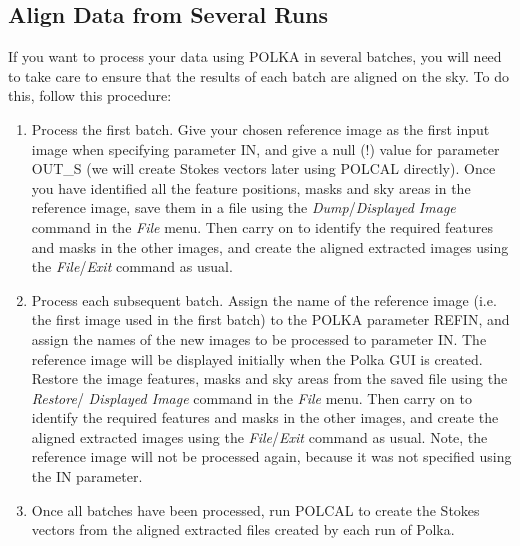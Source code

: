 \documentclass[11pt]{article}
\newcommand{\htmlref}[2]{#1}
\newcommand{\xlabel}[1]{}
\newcommand{\mylabel}[1] {\xlabel{#1}\label{#1}}
\begin{document}
\subsection {\mylabel{POLKA_MULTI_RUN}Align Data from Several Runs}
If you want to process your data using POLKA in several batches, you will
need to take care to ensure that the results of each batch are aligned on
the sky. To do this, follow this procedure:

\begin{enumerate}

\item Process the first batch. Give your chosen reference image as the
first input image when specifying parameter IN, and give a null (!) value
for parameter OUT\_S (we will create Stokes vectors later using POLCAL
directly). Once you have identified all the feature positions, masks and
sky areas in the reference image, save them in a file using the
\htmlref{\emph{Dump}} {POLKA_DUMP}/\emph{Displayed Image} command in the
\htmlref{\emph{File}}{POLKA_FILE_MENU} menu. Then carry on to identify the
required features and masks in the other images, and create the
aligned extracted images using the \htmlref{\emph{File}}
{POLKA_FILE_MENU}/\emph{Exit} command as usual.

\item Process each subsequent batch. Assign the name of the reference
image (i.e. the first image used in the first batch) to the POLKA
parameter REFIN, and assign the names of the new images to be processed
to parameter IN. The reference image will be displayed initially when the
Polka GUI is created. Restore the image features, masks and sky areas
from the saved file using the \htmlref{\emph{Restore}}{POLKA_RESTORE}/{\em
Displayed Image} command in the \htmlref{\emph{File}}{POLKA_FILE_MENU}
menu. Then carry on to identify the required features and masks in the
other images, and create the aligned extracted images using the
\htmlref{\emph{File}} {POLKA_FILE_MENU}/\emph{Exit} command as usual. Note,
the reference image will not be processed again, because it was not
specified using the IN parameter.

\item Once all batches have been processed, run POLCAL to create the
Stokes vectors from the aligned extracted files created by each run of
Polka.

\end{enumerate}
\end{document}

